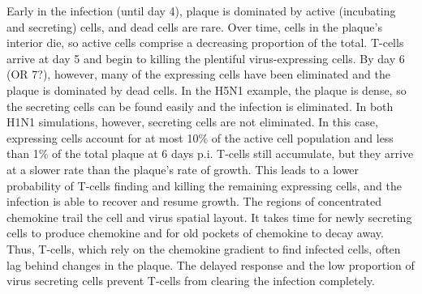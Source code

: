 \documentclass[10pt]{article}
\begin{document}
Early in the infection (until day 4), plaque is dominated by active (incubating and secreting) cells, and dead cells are rare. Over time, cells in the plaque's interior die, so active cells comprise a decreasing proportion of the total. T-cells arrive at day 5 and begin to killing the plentiful virus-expressing cells. By day 6 (OR 7?), however,  many of the expressing cells have been eliminated and the plaque is dominated by dead cells.  In the H5N1
example, the plaque is dense,  so the secreting cells can be found easily and the infection is eliminated.  In both H1N1 simulations, however, secreting cells are not eliminated.  In this case, expressing cells account for at most 10\% of the active cell population and less than  1\% of the total plaque at 6 days p.i.  T-cells still accumulate, but they arrive at a slower rate than the plaque's rate of growth. This leads to a lower probability of T-cells finding and killing the remaining expressing cells, and the infection is able to recover and resume growth.   The regions of concentrated chemokine trail the cell and virus spatial layout.  It takes time for newly secreting cells to produce chemokine and for old pockets of chemokine to decay away.  Thus, T-cells, which rely on the chemokine gradient to find infected cells, often lag behind changes in the plaque.  The delayed response and the low proportion of virus secreting cells prevent T-cells from clearing the infection completely.

\end{document}
